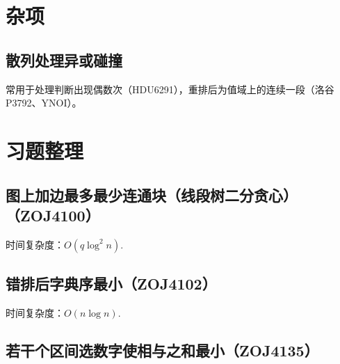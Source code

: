 \documentclass{article}
\begin{document}
\section{杂项}
\subsection{散列处理异或碰撞}
常用于处理判断出现偶数次（HDU6291），重排后为值域上的连续一段（洛谷P3792、YNOI）。


\section{习题整理}
\subsection{图上加边最多最少连通块（线段树二分贪心）（ZOJ4100）}
时间复杂度：$O(q \log ^ {2} n)$.

\subsection{错排后字典序最小（ZOJ4102）}
时间复杂度：$O(n \log n)$.

\subsection{若干个区间选数字使相与之和最小（ZOJ4135）}




% 

% 
\end{document}

